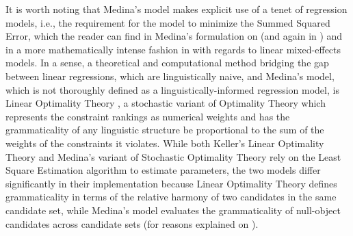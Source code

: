 It is worth noting that Medina's model makes explicit use of a tenet of regression models, i.e., the requirement for the model to minimize the Summed Squared Error, which the reader can find in Medina's formulation on  (and again in ) and in a more mathematically intense fashion in \textcite[13]{r_lmer} with regards to linear mixed-effects models. In a sense, a theoretical and computational method bridging the gap between linear regressions, which are linguistically naive, and Medina's model, which is not thoroughly defined as a linguistically-informed regression model, is Linear Optimality Theory \parencite{Keller2000, Keller2006}, a stochastic variant of Optimality Theory which represents the constraint rankings as numerical weights and has the grammaticality of any linguistic structure be proportional to the sum of the weights of the constraints it violates. While both Keller's Linear Optimality Theory and Medina's variant of Stochastic Optimality Theory rely on the Least Square Estimation algorithm to estimate parameters, the two models differ significantly in their implementation because Linear Optimality Theory defines grammaticality in terms of the relative harmony of two candidates in the same candidate set, while Medina's model evaluates the grammaticality of null-object candidates across candidate sets (for reasons explained on ).
